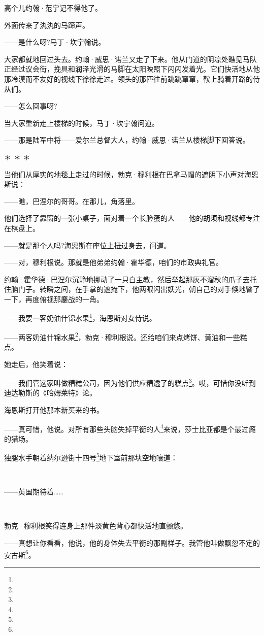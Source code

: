 \par 高个儿约翰·范宁记不得他了。
\par 外面传来了汍汍的马蹄声。
\par ——是什么呀?马丁·坎宁翰说。
\par 大家都就地回过头去。约翰·威思·诺兰又走了下来。他从门道的阴凉处瞧见马队正经过议会街，挽具和润泽光滑的马脚在太阳映照下闪闪发着光。它们快活地从他那冷漠而不友好的视线下徐徐走过。领头的那匹往前跳跳窜窜，鞍上骑着开路的侍从们。
\par ——怎么回事呀?
\par 当大家重新走上楼梯的时候，马丁·坎宁翰问道。
\par ——那是陆军中将——爱尔兰总督大人，约翰·威思·诺兰从楼梯脚下回答说。
\par ＊ ＊ ＊
\par 当他们从厚实的地毯上走过的时候，勃克·穆利根在巴拿马帽的遮阴下小声对海恩斯说：
\par ——瞧，巴涅尔的哥哥。在那儿，角落里。
\par 他们选择了靠窗的一张小桌子，面对着一个长脸蛋的人——他的胡须和视线都专注在棋盘上。
\par ——就是那个人吗?海恩斯在座位上扭过身去，问道。
\par ——对，穆利根说。那就是他弟弟约翰·霍华德，咱们的市政典礼官。
\par 约翰·霍华德·巴涅尔沉静地挪动了一只白主教，然后举起那灰不溜秋的爪子去托住脑门子。转瞬之间，在手掌的遮掩下，他两眼闪出妖光，朝自己的对手倏地瞥了一下，再度俯视那鏖战的一角。
\par ——我要一客奶油什锦水果\footnote{}，海恩斯对女侍说。
\par ——两客奶油什锦水果\footnote{}，勃克·穆利根说。还给咱们来点烤饼、黄油和一些糕点。
\par 她走后，他笑着说：
\par ——我们管这家叫做糟糕公司，因为他们供应糟透了的糕点\footnote{}。哎，可惜你没听到迪达勒斯的《哈姆莱特》论。
\par 海恩斯打开他那本新买来的书。
\par ——真可惜，他说。对所有那些头脑失掉平衡的人\footnote{}来说，莎士比亚都是个最过瘾的猎场。
\par 独腿水手朝着纳尔逊街十四号\footnote{}地下室前那块空地嚷道：
\par  
\par ——英国期待着……
\par  
\par 勃克·穆利根笑得连身上那件淡黄色背心都快活地直颤悠。
\par ——真想让你看看，他说，他的身体失去平衡的那副样子。我管他叫做飘忽不定的安古斯\footnote{}。
